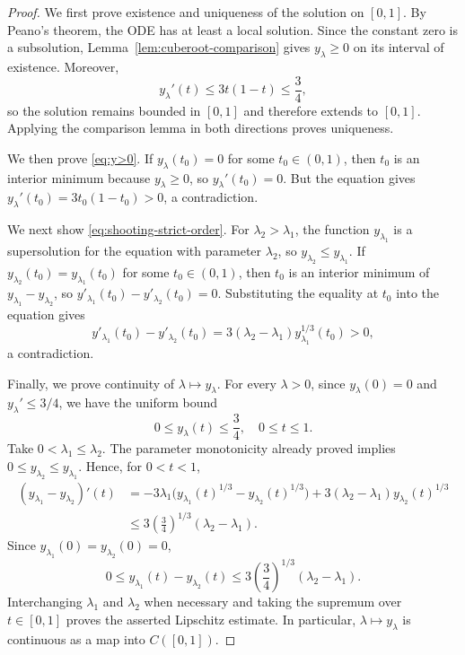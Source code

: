 \documentclass[12pt,preprint]{amsart}
\numberwithin{equation}{section}
\theoremstyle{plain}
\theoremstyle{definition}
\begin{document}
\begin{proof}
We first prove existence and uniqueness of the solution on $[0,1]$.  By
Peano's theorem, the ODE has at least a local solution.  Since the constant
zero is a
subsolution, Lemma~\ref{lem:cuberoot-comparison} gives \(y_\lambda\ge0\) on its
interval of existence.  Moreover,
\[
 y_\lambda'(t)\le3t(1-t)\le\frac34,
\]
so the solution remains bounded in \([0,1]\) and therefore extends to \([0,1]\).  Applying
the comparison lemma in both directions proves uniqueness.

We then prove \eqref{eq:y>0}.  If
\(y_\lambda(t_0)=0\) for some \(t_0\in(0,1)\), then \(t_0\) is an interior
minimum because $y_\lambda\ge0$, so $y_\lambda'(t_0)=0$.  But the
equation gives
\(y_\lambda'(t_0)=3t_0(1-t_0)>0\), a contradiction.

We next show \eqref{eq:shooting-strict-order}.
For $\lambda_2>\lambda_1$, the function $y_{\lambda_1}$ is a
supersolution for the equation with parameter $\lambda_2$, so
$y_{\lambda_2}\le y_{\lambda_1}$.  If
$y_{\lambda_2}(t_0)=y_{\lambda_1}(t_0)$ for some $t_0\in(0,1)$, then $t_0$
is an interior minimum of $y_{\lambda_1}-y_{\lambda_2}$, so
$y'_{\lambda_1}(t_0)-y'_{\lambda_2}(t_0)=0$.  Substituting the equality at
$t_0$ into the equation gives
\[
 y'_{\lambda_1}(t_0)-y'_{\lambda_2}(t_0)
 =3(\lambda_2-\lambda_1)y_{\lambda_1}^{1/3}(t_0)>0,
\]
a contradiction.

Finally, we prove continuity of $\lambda\mapsto y_\lambda$.  For every
$\lambda>0$, since
\(y_\lambda(0)=0\) and \(y_\lambda'\le3/4\), we have the uniform bound
\[
 0\le y_\lambda(t)\le\frac34,
 \quad 0\le t\le1.
\]
Take \(0<\lambda_1\le\lambda_2\).  The parameter monotonicity
already proved implies \(0\le y_{\lambda_2}\le y_{\lambda_1}\).  Hence, for \(0<t<1\),
\[
\begin{aligned}
 (y_{\lambda_1}-y_{\lambda_2})'(t)
 &=-3\lambda_1\bigl(y_{\lambda_1}(t)^{1/3}-y_{\lambda_2}(t)^{1/3}\bigr)
   +3(\lambda_2-\lambda_1)y_{\lambda_2}(t)^{1/3}\\
 &\le 3\left(\frac34\right)^{1/3}(\lambda_2-\lambda_1).
\end{aligned}
\]
Since
\(y_{\lambda_1}(0)=y_{\lambda_2}(0)=0\),
\[
 0\le y_{\lambda_1}(t)-y_{\lambda_2}(t)
 \le 3\left(\frac34\right)^{1/3}(\lambda_2-\lambda_1).
\]
Interchanging \(\lambda_1\) and \(\lambda_2\) when necessary and taking the
supremum over \(t\in[0,1]\) proves the asserted Lipschitz estimate.  In
particular, \(\lambda\mapsto y_\lambda\) is continuous as a map into
\(C([0,1])\).
\end{proof}
\end{document}

